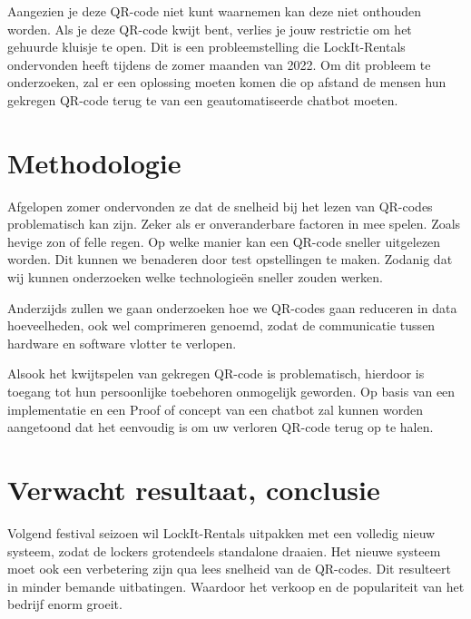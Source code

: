 \documentclass{hogent-article}
\begin{document}
Aangezien je deze QR-code niet kunt waarnemen kan deze niet onthouden worden. Als je deze QR-code kwijt bent, verlies je jouw restrictie om het gehuurde kluisje te open. Dit is een probleemstelling die LockIt-Rentals ondervonden heeft tijdens de zomer maanden van 2022. Om dit probleem te onderzoeken, zal er een oplossing moeten komen die op afstand de mensen hun gekregen QR-code terug te van een geautomatiseerde chatbot moeten.


\section{Methodologie}%
\label{sec:methodologie}

Afgelopen zomer ondervonden ze dat de snelheid bij het lezen van QR-codes problematisch kan zijn. Zeker als er onveranderbare factoren in mee spelen. Zoals hevige zon of felle regen. Op welke manier kan een QR-code sneller uitgelezen worden. Dit kunnen we benaderen door test opstellingen te maken. Zodanig dat wij kunnen onderzoeken welke technologieën sneller zouden werken.

Anderzijds zullen we gaan onderzoeken hoe we QR-codes gaan reduceren in data hoeveelheden, ook wel comprimeren genoemd, zodat de communicatie tussen hardware en software vlotter te verlopen.  

Alsook het kwijtspelen van gekregen QR-code is problematisch,  hierdoor is toegang tot hun persoonlijke toebehoren onmogelijk geworden.
Op basis van een implementatie en een Proof of concept van een chatbot zal kunnen worden aangetoond dat het eenvoudig is om uw verloren QR-code terug op te halen.


\section{Verwacht resultaat, conclusie}%
\label{sec:verwachte_resultaten}

Volgend festival seizoen wil LockIt-Rentals uitpakken met een volledig nieuw systeem, zodat de lockers grotendeels standalone draaien. Het nieuwe systeem moet ook een verbetering zijn qua lees snelheid van de QR-codes.
Dit resulteert in minder bemande uitbatingen. Waardoor het verkoop en de populariteit van het bedrijf enorm groeit.


\printbibliography[heading=bibintoc]
\end{document}

